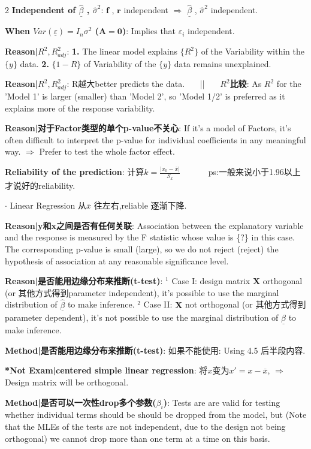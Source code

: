 \documentclass[9pt]{article}
\begin{document}
\begin{multicols}{2}
\textbf{Independent of $\underline{\widehat{\beta}}$ , $\widehat{\sigma}^2$}: $\mathbf{f}$ , $\mathbf{r}$ independent $\Rightarrow$ $\underline{\widehat{\beta}}$ , $\widehat{\sigma}^2$ independent.

\textbf{When $Var(\underline{\varepsilon})=I_n\sigma^2$ ($\mathbf{A}=\mathbf{0}$)}: Implies that $\varepsilon_i$ independent.

\textbf{Reason|$R^2,R_{adj}^2$}: \textbf{1.} The linear model explains $\{R^2\}$ of the Variability within the $\{y\}$ data. \textbf{2.} $\{1-R\}$ of Variability of the $\{y\}$ data remains unexplained.

\textbf{Reason|$R^2,R_{adj}^2$}: R越大better predicts the data. \ \ \ || \ \ \ \textbf{$R^2$比较}: As $R^2$ for the 'Model 1' is larger (smaller) than 'Model 2', so 'Model 1/2' is preferred as it explains more of the response variability.

\textbf{Reason|对于Factor类型的单个p-value不关心}: If it's a model of Factors, it's often difficult to interpret the p-value for individual coefficients in any meaningful way. $\Rightarrow$ Prefer to test the whole factor effect.

\textbf{Reliability of the prediction}: 计算$k=\frac{|x_0-\bar{x}|}{S_x}$ \ \ \ \ \ \ ps:一般来说小于1.96以上才说好的reliability.

$\cdot$ Linear Regression 从$\bar{x}$ 往左右,reliable 逐渐下降.

\textbf{Reason|y和x之间是否有任何关联}: Association between the explanatory variable and the response is measured by the F statistic whose value is \{?\} in this case. The corresponding p-value is small (large), so we do not reject (reject) the hypothesis of association at any reasonable significance level.

\textbf{Reason|是否能用边缘分布来推断(t-test)}: $^1$ Case I: design matrix $\mathbf{X}$ orthogonal (or 其他方式得到parameter independent), it's possible to use the marginal distribution of $\underline{\widehat{\beta}}$ to make inference. $^2$ Case II: $\mathbf{X}$ not orthogonal (or 其他方式得到parameter dependent), it's not possible to use the marginal distribution of $\underline{\widehat{\beta}}$ to make inference. 

\textbf{Method|是否能用边缘分布来推断(t-test)}: 如果不能使用: Using 4.5 后半段内容.

\textbf{*Not Exam|centered simple linear regression}: 将$x$变为$x'=x-\overline{x}$, $\Rightarrow$ Design matrix will be orthogonal.

\textbf{Method|是否可以一次性drop多个参数($\beta_i$)}: Tests are are valid for testing whether individual terms should be should be dropped from the model, but (Note that the MLEs of the tests are not independent, due to the design not being orthogonal) we cannot drop more than one term at a time on this basis. 

\end{multicols}
\end{document}
